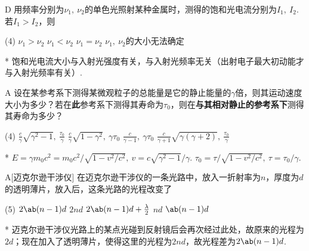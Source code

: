 \begin{choice}{D}
    用频率分别为$\nu_1,\ \nu_2$的单色光照射某种金属时，测得的饱和光电流分别为$I_1,\ I_2$. 若$I_1>I_2$，则
\begin{tasks}(4)
    \task $\nu_1>\nu_2$
    \task $\nu_1<\nu_2$
    \task $\nu_1=\nu_2$
    \task $\nu_1,\ \nu_2$的大小无法确定
\end{tasks}
\end{choice}
\begin{solution}*
    饱和光电流大小与入射光强度有关，与入射光频率无关（出射电子最大初动能才与入射光频率有关）.
\end{solution}

\begin{choice}{A}
    设在某参考系下测得某微观粒子的总能量是它的静止能量的$\gamma$倍，则其运动速度大小为多少？若在\textbf{此}参考系下测得其寿命为$\tau_0$，则在\textbf{与其相对静止的参考系下}测得其寿命为多少？
\begin{tasks}(4)
    \task $\frac c\gamma\sqrt{\gamma^2-1},\ \frac{\tau_0}{\gamma}$
    \task $\frac c\gamma\sqrt{1-\gamma^2},\ \gamma\tau_0$
    \task $\frac{c}{\gamma-1},\ \gamma\tau_0$
    \task $\frac{c}{\gamma+1}\sqrt{\gamma(\gamma+2)},\ \frac{\tau_0}{\gamma}$
\end{tasks}
\end{choice}
\begin{solution}*
    $E=\gamma m_0c^2=m_0c^2/\sqrt{1-v^2/c^2},\ v=c\sqrt{\gamma^2-1}/\gamma$. $\tau_0=\tau/\sqrt{1-v^2/c^2},\ \tau=\tau_0/\gamma$.
\end{solution}

\begin{choice}{A}[迈克尔逊干涉仪]
    在迈克尔逊干涉仪的一条光路中，放入一折射率为$n$，厚度为$d$的透明薄片，放入后，这条光路的光程改变了
    \begin{tasks}(5)
        \task $2\ab(n-1)d$
        \task $2nd$
        \task $2\ab(n-1)d+\frac{\lambda}{2}$
        \task $nd$
        \task $\ab(n-1)d$
    \end{tasks}
\end{choice}
\begin{solution}*
    迈克尔逊干涉仪光路上的某点光碰到反射镜后会再次经过此处，故原来的光程为$2d$；现在加入了透明薄片，使得这里的光程为$2nd$，故光程差为$2\ab(n-1)d$.
\end{solution}

